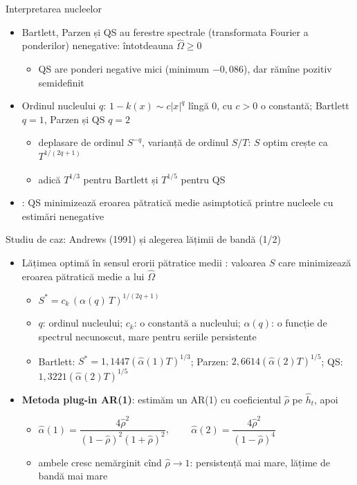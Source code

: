 \begin{frame}{Interpretarea nucleelor}
\itemsize{\small}
\begin{itemize}
    \item Bartlett, Parzen și QS au ferestre spectrale (transformata Fourier a ponderilor) nenegative: întotdeauna $\hat\Omega \ge 0$
    \begin{itemize}
        \item QS are ponderi negative mici (minimum $\ensuremath{-}0{,}086$), dar rămîne pozitiv semidefinit
    \end{itemize}
    \item Ordinul nucleului $q$: $1 - k(x) \sim c|x|^q$ lîngă 0, cu $c > 0$ o constantă; Bartlett $q = 1$, Parzen și QS $q = 2$
    \begin{itemize}
        \item deplasare de ordinul $S^{-q}$, varianță de ordinul $S/T$: $S$ optim crește ca $T^{1/(2q+1)}$
        \item adică $T^{1/3}$ pentru Bartlett și $T^{1/5}$ pentru QS
    \end{itemize}
    \item {}: QS minimizează eroarea pătratică medie asimptotică printre nucleele cu estimări nenegative
\end{itemize}
\end{frame}

\begin{frame}{Studiu de caz: Andrews (1991) și alegerea lățimii de bandă (1/2)}
\itemsize{\small}
\begin{itemize}
    \item Lățimea optimă în sensul erorii pătratice medii : valoarea $S$ care minimizează eroarea pătratică medie a lui $\hat\Omega$
    \begin{itemize}
        \item $S^* = c_k\,(\alpha(q)\,T)^{1/(2q+1)}$
        \item $q$: ordinul nucleului; $c_k$: o constantă a nucleului; $\alpha(q)$: o funcție de spectrul necunoscut, mare pentru seriile persistente
        \item Bartlett: $S^* = 1{,}1447(\hat\alpha(1)T)^{1/3}$; Parzen: $2{,}6614(\hat\alpha(2)T)^{1/5}$; QS: $1{,}3221(\hat\alpha(2)T)^{1/5}$
    \end{itemize}
    \item \textbf{Metoda plug-in AR(1)}: estimăm un AR(1) cu coeficientul $\hat\rho$ pe $\hat h_t$, apoi
    \begin{itemize}
        \item $\hat\alpha(1) = \dfrac{4\hat\rho^2}{(1-\hat\rho)^2(1+\hat\rho)^2}$, $\qquad \hat\alpha(2) = \dfrac{4\hat\rho^2}{(1-\hat\rho)^4}$
        \item ambele cresc nemărginit cînd $\hat\rho \to 1$: persistență mai mare, lățime de bandă mai mare
    \end{itemize}
\end{itemize}
\end{frame}

